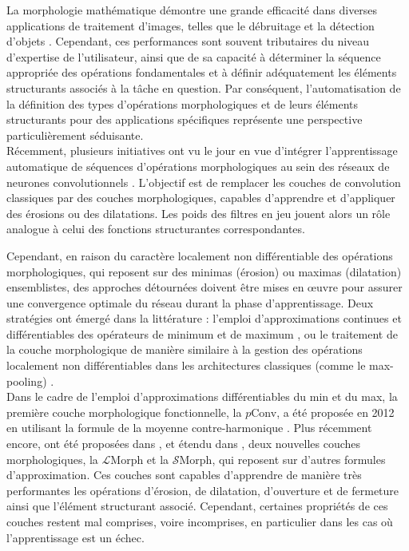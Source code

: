 \vspace{-4mm}
La morphologie mathématique démontre une grande efficacité dans diverses applications de traitement d'images, telles que le débruitage et la détection d'objets \cite{Peters_1995, Horgan_1998}. Cependant, ces performances sont souvent tributaires du niveau d'expertise de l'utilisateur, ainsi que de sa capacité à déterminer la séquence appropriée des opérations fondamentales et à définir adéquatement les éléments structurants associés à la tâche en question. Par conséquent, l'automatisation de la définition des types d'opérations morphologiques et de leurs éléments structurants pour des applications spécifiques représente une perspective particulièrement séduisante. \\

\vspace{-2mm}
Récemment, plusieurs initiatives ont vu le jour en vue d'intégrer l'apprentissage automatique de séquences d'opérations morphologiques au sein des réseaux de neurones convolutionnels \cite{Masci_2012, Hermary_2022, Bloch_2021}. L'objectif est de remplacer les couches de convolution classiques par des couches morphologiques, capables d'apprendre et d'appliquer des érosions ou des dilatations. Les poids des filtres en jeu jouent alors un rôle analogue à celui des fonctions structurantes correspondantes.

\newpage

Cependant, en raison du caractère localement non différentiable des opérations morphologiques, qui reposent sur des minimas (érosion) ou maximas (dilatation) ensemblistes, des approches détournées doivent être mises en œuvre pour assurer une convergence optimale du réseau durant la phase d'apprentissage. Deux stratégies ont émergé dans la littérature : l'emploi d'approximations continues et différentiables des opérateurs de minimum et de maximum \cite{Masci_2012, Shih_2019, Kirszenberg_2021, Hermary_2022}, ou le traitement de la couche morphologique de manière similaire à la gestion des opérations localement non différentiables dans les architectures classiques (comme le max-pooling) \cite{Keiller_2019, Roy_2021}. \\

\vspace{-1.6mm}
Dans le cadre de l'emploi d'approximations différentiables du min et du max, la première couche morphologique fonctionnelle, la $p$Conv, a été proposée en 2012 en utilisant la formule de la moyenne contre-harmonique \cite{Masci_2012}. Plus récemment encore, ont été proposées dans \cite{Kirszenberg_2021}, et étendu dans \cite{Hermary_2022}, deux nouvelles couches morphologiques, la $\mathcal{L}$Morph et la $\mathcal{S}$Morph, qui reposent sur d'autres formules d'approximation. Ces couches sont capables d’apprendre de manière très performantes les opérations d’érosion, de dilatation, d'ouverture et de fermeture ainsi que l’élément structurant associé. Cependant, certaines propriétés de ces couches restent mal comprises, voire incomprises, en particulier dans les cas où l’apprentissage est un échec. \\

